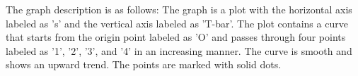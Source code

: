 The graph description is as follows: The graph is a plot with the horizontal axis labeled as 's' and the vertical axis labeled as 'T-bar'. The plot contains a curve that starts from the origin point labeled as 'O' and passes through four points labeled as '1', '2', '3', and '4' in an increasing manner. The curve is smooth and shows an upward trend. The points are marked with solid dots.